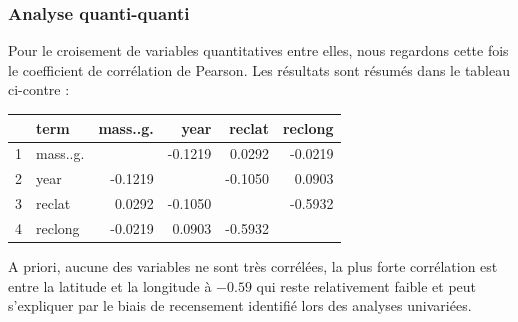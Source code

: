 \documentclass[12pt]{article}
\begin{document}
\subsubsection*{Analyse quanti-quanti}
Pour le croisement de variables quantitatives entre elles, nous regardons cette fois le coefficient de corrélation de Pearson. Les résultats sont résumés dans le tableau ci-contre :
\begin{table}[H]
\centering
\begin{tabular}{rlrrrr}
  \hline
 & term & mass..g. & year & reclat & reclong \\ 
  \hline
1 & mass..g. &  & -0.1219 & 0.0292 & -0.0219 \\ 
  2 & year & -0.1219 &  & -0.1050 & 0.0903 \\ 
  3 & reclat & 0.0292 & -0.1050 &  & -0.5932 \\ 
  4 & reclong & -0.0219 & 0.0903 & -0.5932 &  \\ 
   \hline
\end{tabular}
\end{table}
A priori, aucune des variables ne sont très corrélées, la plus forte corrélation est entre la latitude et la longitude à $-0.59$ qui reste relativement faible et peut s'expliquer par le biais de recensement identifié lors des analyses univariées.
\end{document}
